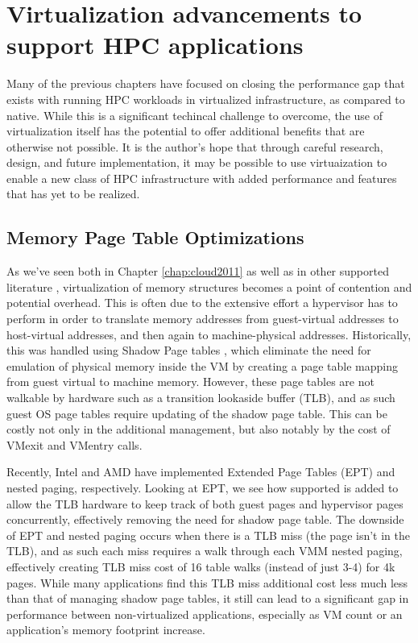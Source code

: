 
\chapter{Virtualization advancements to support HPC applications}
\label{chap:future-work}

Many of the previous chapters have focused on closing the performance gap that exists with running HPC workloads in virtualized infrastructure, as compared to native. While this is a significant techincal challenge to overcome, the use of virtualization itself has the potential to offer additional benefits that are otherwise not possible. It is the author's hope that through careful research, design, and future implementation, it may be possible to use virtuaization to enable a new class of HPC infrastructure with added performance and features that has yet to be realized.    

\section{Memory Page Table Optimizations}

As we've seen both in Chapter \ref{chap:cloud2011} as well as in other supported literature \cite{vm-memory}, virtualization of memory structures becomes a point of contention and potential overhead. This is often due to the extensive effort a hypervisor has to perform in order to translate memory addresses from guest-virtual addresses to host-virtual addresses, and then again to machine-physical addresses.  Historically, this was handled using Shadow Page tables \cite{shadow-pagetables}, which eliminate the need for emulation of physical memory inside the VM by creating a page table mapping from guest virtual to machine memory. However, these page tables are not walkable by hardware such as a transition lookaside buffer (TLB), and as such guest OS page tables require updating of the shadow page table. This can be costly not only in the additional management, but also notably by the cost of VMexit and VMentry calls.

Recently, Intel and AMD have implemented Extended Page Tables (EPT) and nested paging, respectively.  Looking at EPT, we see how supported is added to allow the TLB hardware to keep track of both guest pages and hypervisor pages concurrently, effectively removing the need for shadow page table. The downside of EPT and nested paging occurs when there is a TLB miss (the page isn't in the TLB), and as such each miss requires a walk through each VMM nested paging, effectively creating TLB miss cost of 16 table walks (instead of just 3-4) for 4k pages. While many applications find this TLB miss additional cost less much less than that of managing shadow page tables, it still can lead to a significant gap in performance between non-virtualized applications, especially as VM count or an application's memory footprint increase. 

